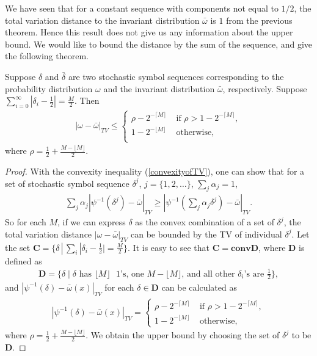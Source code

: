 We have seen that for a constant sequence with components not equal to $1/2$, the total variation
distance to the invariant distribution $\bar{\omega}$ is $1$ from the previous theorem. Hence this
result does not give us any information about the upper bound. We would like to bound the distance
by the sum of the sequence, and give the following theorem.
\begin{theorem}
\label{theoremub}Suppose $\delta$ and $\bar{\delta}$ are two stochastic symbol sequences corresponding
to the probability distribution $\omega$ and the invariant distribution $\bar{\omega}$,
respectively. Suppose $\sum_{i=0}^\infty |\delta_i - \frac{1}{2}| = \frac{M}{2}$. Then
\begin{eqnarray}
|\omega-\bar{\omega}|_{TV} \le  \begin{cases}
                                   \rho - 2^{-\lceil M \rceil } &\text{ if } \rho>1-2^{-\lceil M \rceil },\\
                                    1-2^{-\lfloor M \rfloor}    &\text{ otherwise},                                   \\
                                \end{cases} 
\end{eqnarray}
where $\rho = \frac{1}{2} +  \frac{M-\lfloor M \rfloor}{2}$.
\end{theorem}
\begin{proof}
With the convexity inequality (\ref{convexityofTV}), one can show that for a set of stochastic symbol sequence $\delta^j$, $j=\{1,2,\ldots\}$, $\sum_j{\alpha_j} = 1$,
\begin{eqnarray}
 \sum_j \alpha_j|\psi^{-1}(\delta^j)-\bar{\omega}|_{TV} \ge |\psi^{-1}(\sum_j \alpha_j \delta^j)-\bar{\omega}|_{TV}.
\end{eqnarray}
So for each $M$, if we can express $\delta$ as the convex combination of a set of $\delta^j$, the total variation distance $|\omega-\bar{\omega}|_{TV}$ can be bounded by the TV of individual $\delta^j$. Let the set $\mathbf{C} = \{\delta \, | \,\sum_i|\delta_i-\frac{1}{2}|  =  \frac{M}{2}\}$. It is easy to see that $\mathbf{C} = \mathbf{conv} \mathbf{D}$, where $\mathbf{D}$ is defined as
\begin{eqnarray}
  \mathbf{D}=\{\delta \mid \delta \text{ has } \lfloor M \rfloor \text{ } 1\text{'s, one } M-\lfloor M \rfloor
               \text{, and all other }\delta_i\text{'s are }\frac{1}{2}  \},
\end{eqnarray}
and $|\psi^{-1}(\delta)-\bar{\omega}(x)|_{TV}$ for each $\delta \in  \mathbf{D}$ can be calculated as
\begin{eqnarray}
|\psi^{-1}(\delta)-\bar{\omega}(x)|_{TV} = 
          \begin{cases}
             \rho - 2^{-\lceil M \rceil } &\text{ if } \rho>1-2^{-\lceil M \rceil },\\
             1-2^{-\lfloor M \rfloor}    &\text{ otherwise},                                   
          \end{cases}
\end{eqnarray}
where $\rho = \frac{1}{2} +  \frac{M-\lfloor M \rfloor}{2}$. We obtain the upper bound by choosing the set of $\delta^j$ to be $\mathbf{D}$.
\end{proof}

